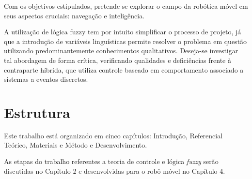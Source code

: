 Com os objetivos estipulados, pretende-se explorar o campo da robótica móvel em
seus aspectos cruciais: navegação e inteligência.

A utilização de lógica fuzzy tem por intuito simplificar o processo de
projeto, já que a introdução de variáveis linguísticas permite
resolver o problema em questão utilizando predominantemente conhecimentos
qualitativos. Deseja-se investigar tal abordagem de forma crítica, verificando
qualidades e deficiências frente à contraparte híbrida, que utiliza controle
baseado em comportamento associado a sistemas a eventos discretos.

\section{Estrutura}

Este trabalho está organizado em cinco capítulos: Introdução,
Referencial Teórico, Materiais e Método e Desenvolvimento. 

As etapas do trabalho referentes a teoria de controle e lógica \textit{fuzzy}
serão discutidas no Capítulo 2 e desenvolvidas para o robô móvel no Capítulo
4.
